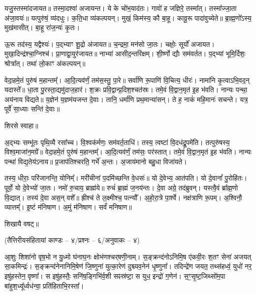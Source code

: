 यजु॒स्तस्मा॑दजायत॥ तस्मा॒दश्वा॑ अजायन्त। ये के चो॑भ॒याद॑तः। गावो॑ ह जज्ञिरे॒ तस्मा᳚त्। तस्मा᳚ज्जा॒ता अ॑जा॒वयः॑॥ यत्पुरु॑षं॒ व्य॑दधुः। क॒ति॒धा व्य॑कल्पयन्। मुखं॒ किम॑स्य॒ कौ बा॒हू। कावू॒रू पादा॑वुच्येते॥ ब्रा॒ह्म॒णो᳚ऽस्य॒ मुख॑मासीत्। बा॒हू रा॑ज॒न्यः॑ कृ॒तः।

ऊ॒रू तद॑स्य॒ यद्वैश्यः॑। प॒द्भ्याꣳ शू॒द्रो अ॑जायत॥ च॒न्द्रमा॒ मन॑सो जा॒तः। चक्षोः॒ सूर्यो॑ अजायत। मुखा॒दिन्द्र॑श्चा॒ग्निश्च॑। प्रा॒णाद्वा॒युर॑जायत॥ नाभ्या॑ आसीद॒न्तरि॑क्षम्। शी॒र्ष्णो द्यौः सम॑वर्तत। प॒द्भ्यां भूमि॒र्दिशः॒ श्रोत्रा᳚त्। तथा॑ लो॒काꣳ अ॑कल्पयन्॥

वेदा॒हमे॒तं पुरु॑षं म॒हान्तम्᳚। आ॒दि॒त्यव॑र्णं॒ तम॑स॒स्तु॒ पा॒रे॥ सर्वा॑णि रू॒पाणि॑ वि॒चित्य॒ धीरः॑। नामा॑नि कृ॒त्वाऽभि॒वद॒न् यदास्ते᳚॥ धा॒ता पु॒रस्ता॒द्यमु॑दाज॒हार॑। श॒क्रः प्रवि॒द्वान्प्र॒दिश॒श्चत॑स्रः। तमे॒वं वि॒द्वान॒मृत॑ इ॒ह भ॑वति। नान्यः पन्था॒ अय॑नाय विद्यते॥ य॒ज्ञेन॑ य॒ज्ञम॑यजन्त दे॒वाः। तानि॒ धर्मा॑णि प्रथ॒मान्या॑सन्। ते ह॒ नाकं॑ महि॒मानः॑ सचन्ते। यत्र॒ पूर्वे॑ सा॒ध्याः सन्ति॑ दे॒वाः॥ 

शिरसे स्वाहा॥

{\small\closesection}


अ॒द्भ्यः सम्भू॑तः पृथि॒व्यै रसा᳚च्च। वि॒श्वक॑र्मणः॒ सम॑वर्त॒ताधि॑। तस्य॒ त्वष्टा॑ वि॒दध॑द्रू॒पमे॑ति। तत्पुरु॑षस्य॒ विश्व॒माजा॑न॒मग्रे᳚॥ वेदा॒हमे॒तं पुरु॑षं म॒हान्तम्᳚। आ॒दि॒त्यव॑र्णं॒ तम॑सः॒ पर॑स्तात्। तमे॒वं वि॒द्वान॒मृत॑ इ॒ह भ॑वति। नान्यः पन्था॑ विद्य॒तेय॑ऽनाय॥ प्र॒जाप॑तिश्चरति॒ गर्भे॑ अ॒न्तः। अ॒जाय॑मानो बहु॒धा विजा॑यते। 

तस्य॒ धीराः॒ परि॑जानन्ति॒ योनिम्᳚। मरी॑चीनां प॒दमि॑च्छन्ति वे॒धसः॑॥ यो दे॒वेभ्य॒ आत॑पति। यो दे॒वानां᳚ पु॒रोहि॑तः। पूर्वो॒ यो दे॒वेभ्यो॑ जा॒तः। नमो॑ रु॒चाय॒ ब्राह्म॑ये॥ रुचं॑ ब्रा॒ह्मं ज॒नय॑न्तः। दे॒वा अग्रे॒ तद॑ब्रुवन्। यस्त्वै॒वं ब्रा᳚ह्म॒णो वि॒द्यात्। तस्य॑ दे॒वा अस॒न् वशे᳚॥ ह्रीश्च॑ ते ल॒क्ष्मीश्च॒ पत्न्यौ᳚। अ॒हो॒रा॒त्रे पा॒र्श्वे। नक्ष॑त्राणि रू॒पम्। अ॒श्विनौ॒ व्यात्तम्᳚। इ॒ष्टं म॑निषाण। अ॒मुं म॑निषाण। सर्वं॑ मनिषाण॥ 

शिखायै वषट्॥

{\small\closesection}

\centerline{\scriptsize (तैत्तिरीयसंहितायां काण्डः – ४/प्रश्नः – ६/अनुवाकः – ४)}

आ॒शुः शिशा॑नो वृष॒भो न यु॒ध्मो घ॑नाघ॒नः क्षोभ॑णश्चर्‌षणी॒नाम्। स॒ङ्क्रन्द॑नो\-ऽनिमि॒ष ए॑कवी॒रः श॒तꣳ सेना॑ अजयत् सा॒कमिन्द्रः॑। स॒ङ्क्रन्द॑नेना\-निमि॒षेण॑ जि॒ष्णुना॑ युत्का॒रेण॑ दुश्च्यव॒नेन॑ धृ॒ष्णुना᳚। तदिन्द्रे॑ण जयत॒ तथ्स॑हध्वं॒ युधो॑ नर॒ इषु॑हस्तेन॒ वृष्णा᳚। स इषु॑हस्तैः॒ सनि॑ष॒ङ्गिभि॑र्व॒शी सꣴस्र॑ष्टा॒ स युध॒ इन्द्रो॑ ग॒णेन॑। स॒ꣳ॒सृ॒ष्ट॒जिथ्सो॑म॒पा बा॑हुश॒ध्यू᳚र्ध्वध॑न्वा॒ प्रति॑हिताभि॒रस्ता᳚।

